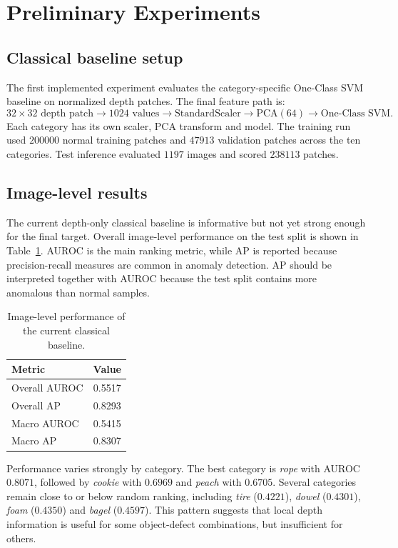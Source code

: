 \section{Preliminary Experiments}

\subsection*{Classical baseline setup}
The first implemented experiment evaluates the category-specific One-Class SVM baseline on normalized depth patches. The final feature path is:
\[
32 \times 32 \text{ depth patch}
\rightarrow 1024 \text{ values}
\rightarrow \text{StandardScaler}
\rightarrow \text{PCA}(64)
\rightarrow \text{One-Class SVM}.
\]
Each category has its own scaler, PCA transform and model. The training run used $200000$ normal training patches and $47913$ validation patches across the ten categories. Test inference evaluated $1197$ images and scored $238113$ patches.

\subsection*{Image-level results}
The current depth-only classical baseline is informative but not yet strong enough for the final target. Overall image-level performance on the test split is shown in Table~\ref{tab:classical-results}. AUROC is the main ranking metric, while AP is reported because precision-recall measures are common in anomaly detection. AP should be interpreted together with AUROC because the test split contains more anomalous than normal samples.

\begin{table}[H]
\centering
\caption{Image-level performance of the current classical baseline.}
\label{tab:classical-results}
\begin{tabular}{lc}
\toprule
\textbf{Metric} & \textbf{Value} \\
\midrule
Overall AUROC & 0.5517 \\
Overall AP & 0.8293 \\
Macro AUROC & 0.5415 \\
Macro AP & 0.8307 \\
\bottomrule
\end{tabular}
\end{table}

Performance varies strongly by category. The best category is \textit{rope} with AUROC $0.8071$, followed by \textit{cookie} with $0.6969$ and \textit{peach} with $0.6705$. Several categories remain close to or below random ranking, including \textit{tire} ($0.4221$), \textit{dowel} ($0.4301$), \textit{foam} ($0.4350$) and \textit{bagel} ($0.4597$). This pattern suggests that local depth information is useful for some object-defect combinations, but insufficient for others.

